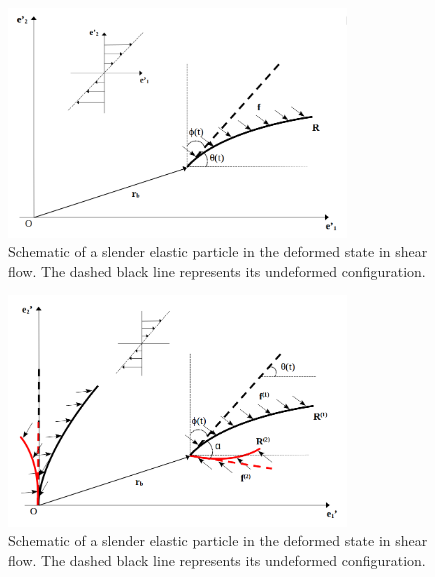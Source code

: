 \documentclass[a4paper,12pt]{report}
\begin{document}
\begin{figure}[htb]
	\begin{center}
		\includegraphics[width=0.8\textwidth]{plot/fluid_general.png}
		\caption{Schematic of a slender elastic particle in the deformed state in shear flow. The dashed black line represents its undeformed configuration.}
		\label{fig:5}
	\end{center}
\end{figure}
\begin{figure}[htb]
	\begin{center}
		\includegraphics[width=0.8\textwidth]{plot/elastic_case/deformed_config.png}
		\caption{Schematic of a slender elastic particle in the deformed state in shear flow. The dashed black line represents its undeformed configuration.}
		\label{fig:22}
	\end{center}
\end{figure}
\end{document}
